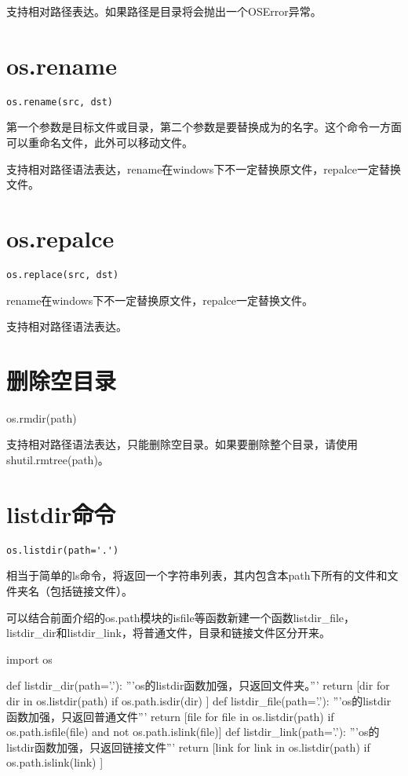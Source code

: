 \documentclass[12pt,oneside]{book}
\begin{document}
\begin{common-format}
支持相对路径表达。如果路径是目录将会抛出一个OSError异常。

\section{os.rename}
\begin{Verbatim}
os.rename(src, dst)
\end{Verbatim}

第一个参数是目标文件或目录，第二个参数是要替换成为的名字。这个命令一方面可以重命名文件，此外可以移动文件。
 
支持相对路径语法表达，rename在windows下不一定替换原文件，repalce一定替换文件。

\section{os.repalce}
\begin{Verbatim}
os.replace(src, dst)
\end{Verbatim}

rename在windows下不一定替换原文件，repalce一定替换文件。

支持相对路径语法表达。

\section{删除空目录}
os.rmdir(path)

支持相对路径语法表达，只能删除空目录。如果要删除整个目录，请使用shutil.rmtree(path)。

\section{listdir命令}
\begin{Verbatim}
os.listdir(path='.')
\end{Verbatim}

相当于简单的ls命令，将返回一个字符串列表，其内包含本path下所有的文件和文件夹名（包括链接文件）。

可以结合前面介绍的os.path模块的isfile等函数新建一个函数listdir\_{}file，listdir\_{}dir和listdir\_{}link，将普通文件，目录和链接文件区分开来。

\begin{tcbpython}[]
import os

def listdir_dir(path='.'):
    '''os的listdir函数加强，只返回文件夹。'''
    return [dir for dir in os.listdir(path) if os.path.isdir(dir) ]
def listdir_file(path='.'):
    '''os的listdir函数加强，只返回普通文件'''
    return [file for file in os.listdir(path) if os.path.isfile(file)
     and  not os.path.islink(file)]
def listdir_link(path='.'):
    '''os的listdir函数加强，只返回链接文件'''
    return [link for link in os.listdir(path) if os.path.islink(link) ]
\end{tcbpython}





\end{common-format}
\end{document}
